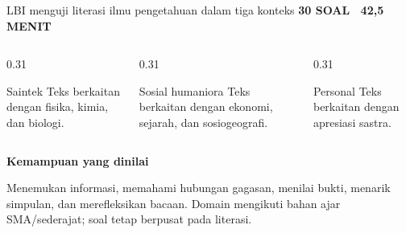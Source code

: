 \documentclass[aspectratio=169,11pt]{beamer}
\newcommand{\kicker}[1]{%
  {\color{StudentCyan}\bfseries\fontsize{10.5}{13}\selectfont\MakeUppercase{#1}}\par\vspace{0.11cm}
}
\begin{document}
\begin{frame}{LBI menguji literasi ilmu pengetahuan dalam tiga konteks}
  \kicker{30 Soal \textbar\ 42,5 Menit}
  \begin{columns}[T,onlytextwidth]
    \begin{column}{0.31\textwidth}
      \begin{block}{Saintek}
        Teks berkaitan dengan fisika, kimia, dan biologi.
      \end{block}
    \end{column}
    \begin{column}{0.31\textwidth}
      \begin{block}{Sosial humaniora}
        Teks berkaitan dengan ekonomi, sejarah, dan sosiogeografi.
      \end{block}
    \end{column}
    \begin{column}{0.31\textwidth}
      \begin{block}{Personal}
        Teks berkaitan dengan apresiasi sastra.
      \end{block}
    \end{column}
  \end{columns}
  \vspace{0.20cm}
  {\color{StudentBlue}\bfseries Kemampuan yang dinilai}\par
  \vspace{0.05cm}
  {\fontsize{11.5}{14.3}\selectfont Menemukan informasi, memahami hubungan gagasan, menilai bukti, menarik simpulan, dan merefleksikan bacaan.}
  \vspace{0.12cm}
  {\color{StudentGray}\fontsize{9.8}{12}\selectfont Domain mengikuti bahan ajar SMA/sederajat; soal tetap berpusat pada literasi.}
\end{frame}
\end{document}
